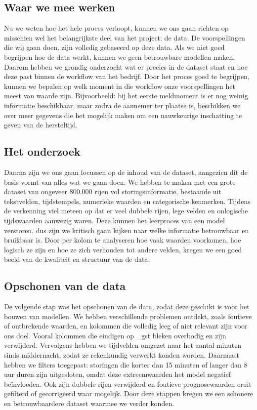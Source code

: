 \documentclass{article}
\begin{document}
\subsection{Waar we mee werken}
Nu we weten hoe het hele proces verloopt, kunnen we ons gaan richten op misschien wel het belangrijkste deel van het project: de data. De voorspellingen die wij gaan doen, zijn volledig gebaseerd op deze data. Als we niet goed begrijpen hoe de data werkt, kunnen we geen betrouwbare modellen maken. Daarom hebben we grondig onderzocht wat er precies in de dataset staat en hoe deze past binnen de workflow van het bedrijf. Door het proces goed te begrijpen, kunnen we bepalen op welk moment in die workflow onze voorspellingen het meest van waarde zijn. Bijvoorbeeld: bij het eerste meldmoment is er nog weinig informatie beschikbaar, maar zodra de aannemer ter plaatse is, beschikken we over meer gegevens die het mogelijk maken om een nauwkeurige inschatting te geven van de hersteltijd.

\subsection{Het onderzoek}
Daarna zijn we ons gaan focussen op de inhoud van de dataset, aangezien dit de basis vormt van alles wat we gaan doen. We hebben te maken met een grote dataset van ongeveer 800.000 rijen vol storingsinformatie, bestaande uit tekstvelden, tijdstempels, numerieke waarden en categorische kenmerken. Tijdens de verkenning viel meteen op dat er veel dubbele rijen, lege velden en onlogische tijdswaarden aanwezig waren. Deze kunnen het leerproces van een model verstoren, dus zijn we kritisch gaan kijken naar welke informatie betrouwbaar en bruikbaar is. Door per kolom te analyseren hoe vaak waarden voorkomen, hoe logisch ze zijn en hoe ze zich verhouden tot andere velden, kregen we een goed beeld van de kwaliteit en structuur van de data.

\subsection{Opschonen van de data}
De volgende stap was het opschonen van de data, zodat deze geschikt is voor het bouwen van modellen. We hebben verschillende problemen ontdekt, zoals foutieve of ontbrekende waarden, en kolommen die volledig leeg of niet relevant zijn voor ons doel. Vooral kolommen die eindigen op \_gst bleken overbodig en zijn verwijderd. Vervolgens hebben we tijdvelden omgezet naar het aantal minuten sinds middernacht, zodat ze rekenkundig verwerkt konden worden. Daarnaast hebben we filters toegepast: storingen die korter dan 15 minuten of langer dan 8 uur duren zijn uitgesloten, omdat deze extreemwaarden het model negatief beïnvloeden. Ook zijn dubbele rijen verwijderd en foutieve prognosewaarden eruit gefilterd of gecorrigeerd waar mogelijk. Door deze stappen kregen we een schonere en betrouwbaardere dataset waarmee we verder konden.
\end{document}
